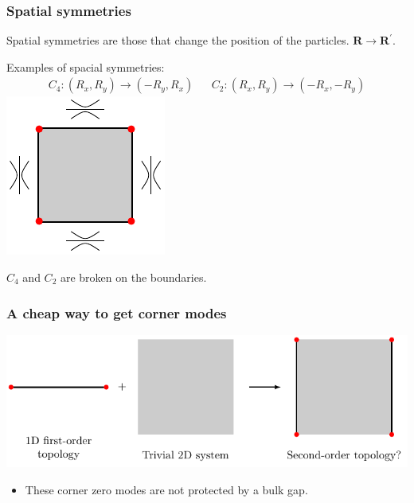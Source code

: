 \documentclass{beamer}
\renewcommand{\(}{\left(}
\renewcommand{\)}{\right)}
\renewcommand{\[}{\left[}
\renewcommand{\]}{\right]}
\begin{document}
\begin{frame}
    \frametitle{Spatial symmetries}

    \begin{framed}
        Spatial symmetries are those that change the position of the particles. $\bm R \rightarrow \bm R^\prime$.
    \end{framed}
    Examples of spacial symmetries: 
    \begin{align*}
        C_4 : (R_x, R_y) \rightarrow (-R_y, R_x) && C_2 : (R_x, R_y) \rightarrow (-R_x, -R_y)
    \end{align*}
    \centering
    \includegraphics[]{second_order_surface.pdf}

    $C_4$ and $C_2$ are broken on the boundaries.  
\end{frame}

\begin{frame}
    \frametitle{A cheap way to get corner modes}
    \begin{center}
        \includegraphics[scale=0.85]{cheap_corner.pdf}
    \end{center}
    \begin{itemize}
        \item These corner zero modes are not protected by a bulk gap. 
    \end{itemize}

\end{frame}
\end{document}
